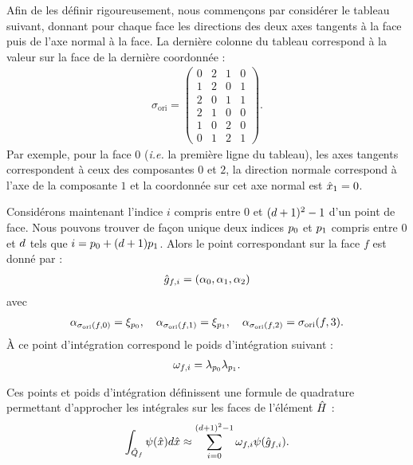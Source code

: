 \newcommand{\FPermut}{\sigma_{\mathrm{ori}}} %

Afin de les définir rigoureusement, nous commençons par considérer
le tableau suivant, donnant pour chaque face les directions des deux axes
tangents à la face puis de l’axe normal à la face. La dernière colonne du
tableau correspond à la valeur sur la face de la dernière coordonnée :
\begin{align}
	\FPermut =
	\begin{pmatrix}
		0 & 2 & 1 & 0 \\
		1 & 2 & 0 & 1 \\
		2 & 0 & 1 & 1 \\
		2 & 1 & 0 & 0 \\
		1 & 0 & 2 & 0 \\
		0 & 1 & 2 & 1
	\end{pmatrix} .
\end{align}
Par exemple, pour la face $0$ (\textit{i.e.} la première ligne du tableau),
les axes tangents correspondent à ceux des composantes $0$ et $2$,
la direction normale correspond à l'axe de la composante $1$
et la coordonnée sur cet axe normal est $\hat{x}_1 = 0$.

Considérons maintenant l'indice $i$ compris entre $0$ et $(d + 1)^2 - 1$
d’un point de face. Nous pouvons trouver de façon unique deux indices
${p_{0}}$ et ${p_{1}}$ compris entre $0$ et $d$ tels que $i = {p_{0}} + (d + 1){p_{1}}$.
Alors le point correspondant sur la face $f$ est donné par :
\begin{align}
	\hat{g}_{f,i} = \left(\alpha_0,\alpha_1,\alpha_2\right)
\end{align}
avec
\begin{align}
	\alpha_{\FPermut(f,0)} = \GLn_\MId{p}{0} , \quad
	\alpha_{\FPermut(f,1)} = \GLn_\MId{p}{1} , \quad
	\alpha_{\FPermut(f,2)} = \FPermut(f,3) .
\end{align}
À ce point d’intégration correspond le poids d’intégration suivant :
\begin{align}
	\omega_{f,i} = \lambda_{p_{0}} \lambda_{p_{1}} .
\end{align}

Ces points et poids d’intégration définissent une formule de quadrature permettant
d’approcher les intégrales sur les faces de l’élément $\hat{H}$ :
\begin{align}
	\int_{\hat{Q}_f} \psi (\hat{x}) d\hat{x} \approx
	\sum_{i=0}^{(d + 1)^2 - 1} \omega_{f,i} \psi (\hat{g}_{f,i})
	\label{eq:quadrature_surface} .
\end{align}

